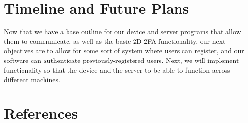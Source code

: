 \documentclass{article} %
\begin{document}
\section{Timeline and Future Plans}

Now that we have a base outline for our device and server programs that
allow them to communicate, as well as the basic 2D-2FA functionality,
our next objectives are to allow for some sort of system where users can
register, and our software can authenticate previously-registered users.
Next, we will implement functionality so that the device and the server
to be able to function across different machines. 

\section{References}
\end{document}
